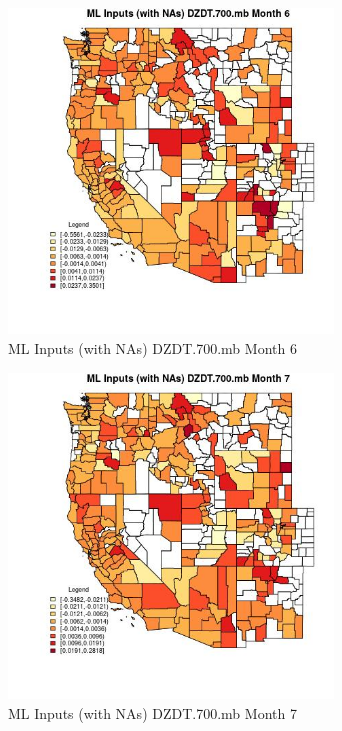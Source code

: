 \begin{figure} 
\centering  
\includegraphics[width=0.77\textwidth]{Code_Outputs/Report_ML_input_PM25_Step4_part_f_de_duplicated_aveswNAs_CountyDZDT700mbmedianMonth6.jpg} 
\caption{\label{fig:Report_ML_input_PM25_Step4_part_f_de_duplicated_aveswNAsCountyDZDT700mbmedianMonth6}ML Inputs (with NAs) DZDT.700.mb Month 6} 
\end{figure} 
 

\begin{figure} 
\centering  
\includegraphics[width=0.77\textwidth]{Code_Outputs/Report_ML_input_PM25_Step4_part_f_de_duplicated_aveswNAs_CountyDZDT700mbmedianMonth7.jpg} 
\caption{\label{fig:Report_ML_input_PM25_Step4_part_f_de_duplicated_aveswNAsCountyDZDT700mbmedianMonth7}ML Inputs (with NAs) DZDT.700.mb Month 7} 
\end{figure} 
 

